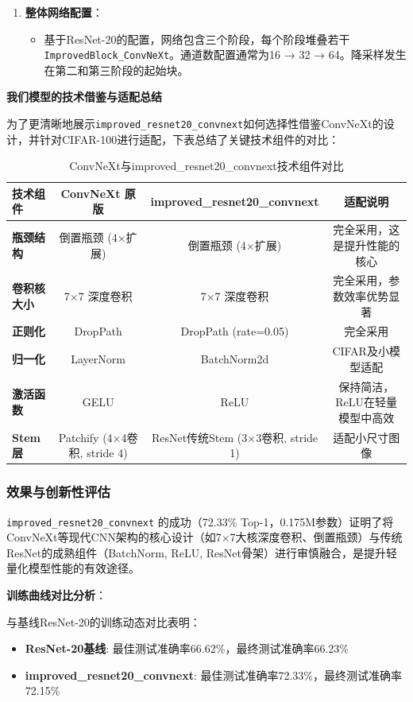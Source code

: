 \documentclass[a4paper]{article}
\begin{document}
\begin{enumerate}
    \item \textbf{整体网络配置}：
    \begin{itemize}
        \item 基于ResNet-20的配置，网络包含三个阶段，每个阶段堆叠若干\texttt{ImprovedBlock\_ConvNeXt}。通道数配置通常为16 → 32 → 64。降采样发生在第二和第三阶段的起始块。
    \end{itemize}
\end{enumerate}

\textbf{我们模型的技术借鉴与适配总结}

为了更清晰地展示\texttt{improved\_resnet20\_convnext}如何选择性借鉴ConvNeXt的设计，并针对CIFAR-100进行适配，下表总结了关键技术组件的对比：

\begin{table}[H]
\centering
\caption{ConvNeXt与improved\_resnet20\_convnext技术组件对比}
\begin{tabular}{lccc}
\toprule
\textbf{技术组件} & \textbf{ConvNeXt 原版} & \textbf{improved\_resnet20\_convnext} & \textbf{适配说明} \\
\midrule
\textbf{瓶颈结构} & 倒置瓶颈 (4×扩展) & 倒置瓶颈 (4×扩展) & 完全采用，这是提升性能的核心 \\
\textbf{卷积核大小} & 7×7 深度卷积 & 7×7 深度卷积 & 完全采用，参数效率优势显著 \\
\textbf{正则化} & DropPath & DropPath (rate=0.05) & 完全采用 \\
\textbf{归一化} & LayerNorm & BatchNorm2d & CIFAR及小模型适配 \\
\textbf{激活函数} & GELU & ReLU & 保持简洁，ReLU在轻量模型中高效 \\
\textbf{Stem层} & Patchify (4×4卷积, stride 4) & ResNet传统Stem (3×3卷积, stride 1) & 适配小尺寸图像 \\
\bottomrule
\end{tabular}
\end{table}

\subsubsection{效果与创新性评估}

\texttt{improved\_resnet20\_convnext} 的成功（72.33\% Top-1，0.175M参数）证明了将ConvNeXt等现代CNN架构的核心设计（如7×7大核深度卷积、倒置瓶颈）与传统ResNet的成熟组件（BatchNorm, ReLU, ResNet骨架）进行审慎融合，是提升轻量化模型性能的有效途径。

\textbf{训练曲线对比分析}：

与基线ResNet-20的训练动态对比表明：
\begin{itemize}
    \item \textbf{ResNet-20基线}: 最佳测试准确率66.62\%，最终测试准确率66.23\%
    \item \textbf{improved\_resnet20\_convnext}: 最佳测试准确率72.33\%，最终测试准确率72.15\%
\end{itemize}
\end{document}
